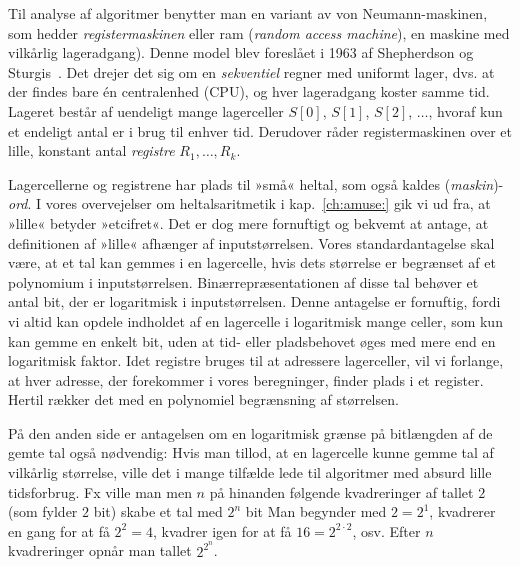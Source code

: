 Til analyse af algoritmer benytter man en variant av von Neumann-maskinen, som hedder \emph{registermaskinen} eller ram (\emph{random access machine}),
%
%
%
en maskine med vilkårlig lageradgang).
Denne model blev foreslået i 1963 af Shepherdson
 og Sturgis~\cite{Shepherdson-Sturgis}. 
Det drejer det sig om en \emph{sekventiel} regner
med uniformt lager, dvs. at der findes bare én centralenhed (CPU),
og hver lageradgang koster samme tid.
Lageret består af uendeligt mange lagerceller $S[0]$, $S[1]$, $S[2]$, $\ldots$, hvoraf kun et endeligt antal er i brug til enhver tid.
Derudover råder registermaskinen over et lille, konstant antal \emph{registre} $R_1,\ldots, R_k$.

Lagercellerne og registrene
har plads til »små« heltal, som også kaldes (\emph{maskin})-\emph{ord}.
I vores overvejelser om heltalsaritmetik i kap.~\ref{ch:amuse:} gik vi ud fra, at »lille« betyder »etcifret«.
Det er dog mere fornuftigt og bekvemt at antage, at definitionen af »lille« afhænger af inputstørrelsen.
Vores standardantagelse skal være, at et tal kan gemmes i en lagercelle, hvis dets størrelse er begrænset af et polynomium i inputstørrelsen.
Binærrepræsentationen af disse tal behøver et antal bit, der er logaritmisk i inputstørrelsen.
Denne antagelse er fornuftig, fordi vi altid kan opdele indholdet af en lagercelle i logaritmisk mange celler, som kun kan gemme en enkelt bit, uden at tid- eller pladsbehovet øges med mere end en logaritmisk faktor.
Idet registre bruges til at adressere lagerceller, vil vi forlange, at hver adresse, der forekommer i vores beregninger, finder plads i et register.
Hertil rækker det med en polynomiel begrænsning af størrelsen.

På den anden side er antagelsen om en logaritmisk grænse på bitlængden af de gemte tal også nødvendig:
Hvis man tillod, at en lagercelle kunne gemme tal af vilkårlig størrelse, ville det i mange tilfælde lede til algoritmer med absurd lille tidsforbrug.
Fx ville man men $n$ på hinanden følgende kvadreringer af tallet $2$ (som fylder $2$ bit) skabe et tal med $2^n$ bit
Man begynder med $2=2^1$, kvadrerer en gang for at få $2^2=4$, kvadrer igen for at få $16=2^{2\cdot 2}$, osv. 
Efter $n$ kvadreringer opnår man tallet $2^{2^n}$.

